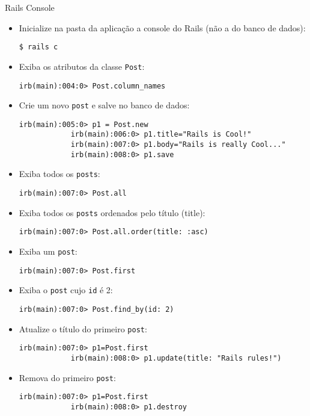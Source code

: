 \begin{frame}{Rails Console}
	\begin{itemize}
		\item Inicialize \alert{na pasta da aplicação} a console do Rails (não a do banco de dados):
		\begin{lstlisting}[style=BashInputBasicStyle]
			$ rails c
		\end{lstlisting}
		
		\item Exiba os atributos da classe \verb|Post|:
		\begin{lstlisting}[style=BashInputBasicStyle]
			irb(main):004:0> Post.column_names
		\end{lstlisting}
		
		\item Crie um novo \verb|post| e salve no banco de dados:
		\begin{lstlisting}[style=BashInputBasicStyle]
			irb(main):005:0> p1 = Post.new
			irb(main):006:0> p1.title="Rails is Cool!"
			irb(main):007:0> p1.body="Rails is really Cool..."
			irb(main):008:0> p1.save
		\end{lstlisting}
		
		\item Exiba todos os \verb|posts|:
		\begin{lstlisting}[style=BashInputBasicStyle]
			irb(main):007:0> Post.all
		\end{lstlisting}
		
		\item Exiba todos os \verb|posts| ordenados pelo título (title):
		\begin{lstlisting}[style=BashInputBasicStyle]
			irb(main):007:0> Post.all.order(title: :asc)
		\end{lstlisting}
		
		\item Exiba um \verb|post|:
		\begin{lstlisting}[style=BashInputBasicStyle]
			irb(main):007:0> Post.first
		\end{lstlisting}
		
		\item Exiba o \verb|post| cujo \verb|id| é 2:
		\begin{lstlisting}[style=BashInputBasicStyle]
			irb(main):007:0> Post.find_by(id: 2)
		\end{lstlisting}
		
		\item Atualize o título do primeiro \verb|post|:
		\begin{lstlisting}[style=BashInputBasicStyle]
			irb(main):007:0> p1=Post.first
			irb(main):008:0> p1.update(title: "Rails rules!")
		\end{lstlisting}
		
		\item Remova do primeiro \verb|post|:
		\begin{lstlisting}[style=BashInputBasicStyle]
			irb(main):007:0> p1=Post.first
			irb(main):008:0> p1.destroy
		\end{lstlisting}
		
	\end{itemize}
\end{frame}